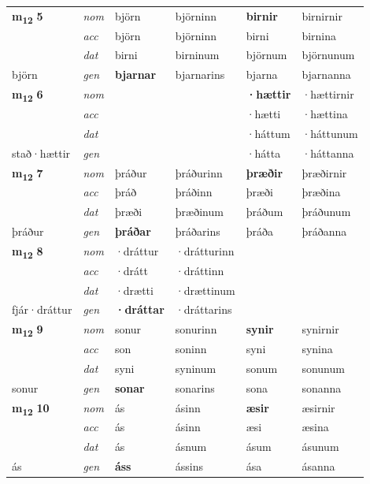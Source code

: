 \begin{longtable}[l]{X>{\footnotesize\itshape}XXXXX}
\multirow{3}{*}{{{\textbf{m{\textsubscript{12}}} \Large{\textbf{5}}}}} & nom & björn & björninn & \textbf{birnir} & birnirnir \\*
 & acc & björn & björninn & birni & birnina \\*
 & dat & birni & birninum & björnum & björnunum \\*
 {\footnotesize{björn}} & gen & \textbf{bjarnar} & bjarnarins & bjarna & bjarnanna \\
\midrule

\multirow{3}{*}{{{\textbf{m{\textsubscript{12}}} \Large{\textbf{6}}}}} & nom &  &  & \textbf{·hættir} & ·hættirnir \\*
 & acc &  &  & ·hætti & ·hættina \\*
 & dat &  &  & ·háttum & ·háttunum \\*
 {\footnotesize{stað\allowbreak ·hættir}} & gen & \textbf{} &  & ·hátta & ·háttanna \\
\midrule

\multirow{3}{*}{{{\textbf{m{\textsubscript{12}}} \Large{\textbf{7}}}}} & nom & þráður & þráðurinn & \textbf{þræðir} & þræðirnir \\*
 & acc & þráð & þráðinn & þræði & þræðina \\*
 & dat & þræði & þræðinum & þráðum & þráðunum \\*
 {\footnotesize{þráður}} & gen & \textbf{þráðar} & þráðarins & þráða & þráðanna \\
\midrule

\multirow{3}{*}{{{\textbf{m{\textsubscript{12}}} \Large{\textbf{8}}}}} & nom & ·dráttur & ·drátturinn & \textbf{} &  \\*
 & acc & ·drátt & ·dráttinn &  &  \\*
 & dat & ·drætti & ·drættinum &  &  \\*
 {\footnotesize{fjár\allowbreak ·dráttur}} & gen & \textbf{·dráttar} & ·dráttarins &  &  \\
\midrule

\multirow{3}{*}{{{\textbf{m{\textsubscript{12}}} \Large{\textbf{9}}}}} & nom & sonur & sonurinn & \textbf{synir} & synirnir \\*
 & acc & son & soninn & syni & synina \\*
 & dat & syni & syninum & sonum & sonunum \\*
 {\footnotesize{sonur}} & gen & \textbf{sonar} & sonarins & sona & sonanna \\
\midrule

\multirow{3}{*}{{{\textbf{m{\textsubscript{12}}} \Large{\textbf{10}}}}} & nom & ás & ásinn & \textbf{æsir} & æsirnir \\*
 & acc & ás & ásinn & æsi & æsina \\*
 & dat & ás & ásnum & ásum & ásunum \\*
 {\footnotesize{ás}} & gen & \textbf{áss} & ássins & ása & ásanna \\
\midrule


\end{longtable}
